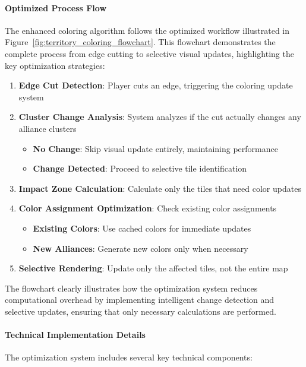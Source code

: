 \documentclass[english]{tudscrreprt}
\begin{document}
\paragraph{Optimized Process Flow}
The enhanced coloring algorithm follows the optimized workflow illustrated in Figure~\ref{fig:territory_coloring_flowchart}. This flowchart demonstrates the complete process from edge cutting to selective visual updates, highlighting the key optimization strategies:

\begin{enumerate}
  \item \textbf{Edge Cut Detection}: Player cuts an edge, triggering the coloring update system
  \item \textbf{Cluster Change Analysis}: System analyzes if the cut actually changes any alliance clusters
    \begin{itemize}
      \item \textbf{No Change}: Skip visual update entirely, maintaining performance
      \item \textbf{Change Detected}: Proceed to selective tile identification
    \end{itemize}
  \item \textbf{Impact Zone Calculation}: Calculate only the tiles that need color updates
  \item \textbf{Color Assignment Optimization}: Check existing color assignments
    \begin{itemize}
      \item \textbf{Existing Colors}: Use cached colors for immediate updates
      \item \textbf{New Alliances}: Generate new colors only when necessary
    \end{itemize}
  \item \textbf{Selective Rendering}: Update only the affected tiles, not the entire map
\end{enumerate}

The flowchart clearly illustrates how the optimization system reduces computational overhead by implementing intelligent change detection and selective updates, ensuring that only necessary calculations are performed.

\paragraph{Technical Implementation Details}
The optimization system includes several key technical components:
\end{document}
